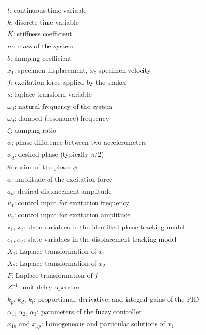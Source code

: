 \documentclass[lettersize,journal]{IEEEtran}
\begin{document}
\begin{table}[h]
    \centering
    \begin{tabular}{|l|}
        \hline
        $t$: continuous time variable \\
	 $k$: discrete time variable \\ 
        $K$:  stiffness coefficient \\
	 $m$:  mass of the system \\
        $b$:  damping coefficient \\
        $x_1$:  specimen displacement,  $x_2$  specimen velocity \\
        $f$:  excitation force applied by the shaker \\
        $s$:  laplace transform variable \\
        $\omega_0$:  natural frequency of the system \\
        $\omega_d$:  damped (resonance) frequency \\
        $\zeta$:  damping ratio \\
        $\phi$:  phase difference between two accelerometers  \\
        $\phi_d$:  desired phase (typically $\pi/2$) \\
        $\theta$:  cosine of the phase $\phi$ \\
        $a$:  amplitude of the excitation force \\
        $a_d$:  desired displacement amplitude \\
        $u_1$: control input for excitation frequency \\
        $u_2$:  control input for excitation amplitude \\
        $z_1$, $z_2$:  state variables in the identified phase tracking model \\
        $e_1$, $e_2$:  state variables in the displacement tracking model \\
$X_1$: Laplace transformation of $x_1$ \\
$X_2$: Laplace transformation of $x_2$ \\
$F$: Laplace transformation of $f$ \\
$Z^{-1}$: unit delay operator \\
$k_p$, $k_d$, $k_i$: proportional, derivative, and integral gains of the PID\\
$\alpha_1$, $\alpha_2$, $\alpha_3$: parameters of the fuzzy controller \\
$x_{1h}$ and $x_{1p}$: homogeneous and particular solutions of $x_1$ \\

\end{tabular}
\end{table}
\end{document}
